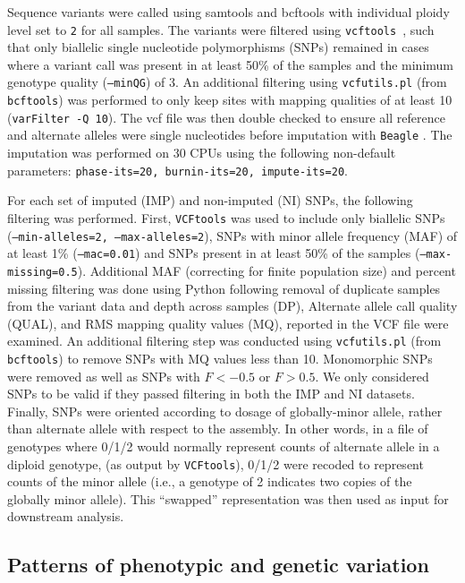 \documentclass[smallextended]{svjour3}
\begin{document}
Sequence variants were called using samtools and bcftools \citep[][version
1.3]{Li:2009ka} with individual  ploidy level set to \texttt{2} for all samples.
The variants were filtered  using \texttt{vcftools}~\citep[][version
0.1.14]{Danecek:2011gz}, such that only biallelic single nucleotide
polymorphisms (SNPs) remained in cases where a variant call was present in at
least 50\% of the samples and the minimum genotype quality (\texttt{--minQG}) of
3. An additional filtering using \texttt{vcfutils.pl} (from \texttt{bcftools})
was performed to only keep sites with mapping qualities of at least 10
(\texttt{varFilter -Q 10}). The vcf file was then double checked to ensure all
reference and alternate alleles were single nucleotides before imputation with
\texttt{Beagle} \citep[][version 4.0, r1399]{Browning:2007ge}.  The imputation
was performed on 30 CPUs using the following non-default parameters:
\texttt{phase-its=20, burnin-its=20, impute-its=20}.

For each set of imputed (IMP) and non-imputed (NI) SNPs, the following filtering
was performed.  First, \texttt{VCFtools} was used to include only biallelic
SNPs (\texttt{--min-alleles=2, --max-alleles=2}), SNPs with minor allele
frequency (MAF) of at least 1\% (\texttt{--mac=0.01}) and SNPs present in at
least 50\% of the samples (\texttt{--max-missing=0.5}).  Additional MAF
(correcting for  finite population size) and percent missing filtering was done
using Python following removal of duplicate samples from the variant data and
depth across samples (DP), Alternate allele call quality (QUAL), and RMS mapping
quality values (MQ), reported in the VCF file were examined.  An additional
filtering step was conducted using \texttt{vcfutils.pl} (from \texttt{bcftools})
to remove SNPs with MQ values less than 10.  Monomorphic SNPs were removed as
well as SNPs with $F < -0.5$ or $F > 0.5$.  We only considered SNPs
to be valid if they passed filtering in both the IMP and NI datasets. Finally,
SNPs were oriented according to dosage of globally-minor allele, rather than
alternate allele with respect to the assembly. In other words, in a file of
genotypes where 0/1/2 would normally represent counts of alternate allele in a
diploid genotype,  (as output by \texttt{VCFtools}), 0/1/2 were recoded to
represent counts of the minor allele (i.e., a genotype of 2 indicates two copies
of the globally minor allele). This ``swapped'' representation was then used as
input for downstream analysis.

\subsection*{Patterns of phenotypic and genetic variation}
\end{document}

